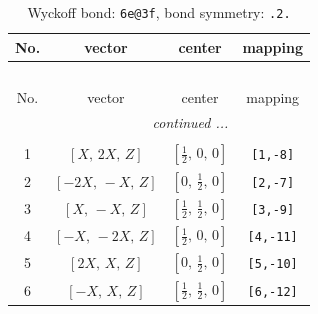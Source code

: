 \documentclass[fleqn,8pt]{jsarticle}
\begin{document}
\renewcommand{\arraystretch}{1.2}
\begin{longtable}{cccc}
\caption{Wyckoff bond: {\tt 6e@3f}, bond symmetry: {\tt .2.}}
 \\
 \hline \hline
No. & vector & center & mapping \\ \hline \endfirsthead

\multicolumn{3}{l}{\tablename\ \thetable{}} \\
 \hline \hline
No. & vector & center & mapping \\ \hline \endhead

 \hline \hline
\multicolumn{3}{r}{\footnotesize\it continued ...} \\ \endfoot

 \hline \hline
\multicolumn{3}{r}{} \\ \endlastfoot

1 & $\left[ X,\, 2 X,\, Z \right]$ & $\left[ \frac{1}{2},\, 0,\, 0 \right]$ & {\tt [1,-8]} \\ \hline
2 & $\left[ - 2 X,\, - X,\, Z \right]$ & $\left[ 0,\, \frac{1}{2},\, 0 \right]$ & {\tt [2,-7]} \\ \hline
3 & $\left[ X,\, - X,\, Z \right]$ & $\left[ \frac{1}{2},\, \frac{1}{2},\, 0 \right]$ & {\tt [3,-9]} \\ \hline
4 & $\left[ - X,\, - 2 X,\, Z \right]$ & $\left[ \frac{1}{2},\, 0,\, 0 \right]$ & {\tt [4,-11]} \\ \hline
5 & $\left[ 2 X,\, X,\, Z \right]$ & $\left[ 0,\, \frac{1}{2},\, 0 \right]$ & {\tt [5,-10]} \\ \hline
6 & $\left[ - X,\, X,\, Z \right]$ & $\left[ \frac{1}{2},\, \frac{1}{2},\, 0 \right]$ & {\tt [6,-12]} \\
\end{longtable}
\renewcommand{\arraystretch}{1.2}
\end{document}
